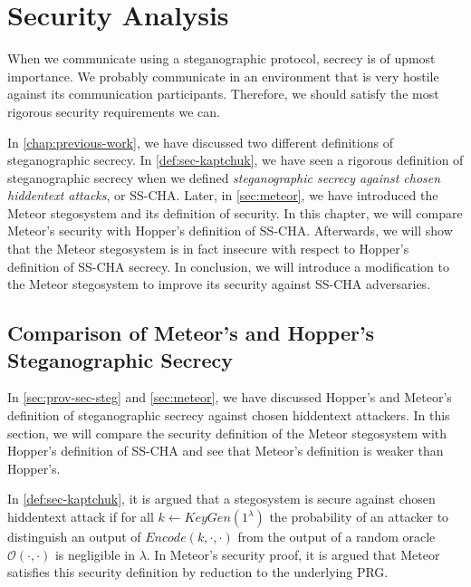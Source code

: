 \chapter{Security Analysis}
\label{chap:security}

When we communicate using a steganographic protocol, secrecy is of upmost importance.
We probably communicate in an environment that is very hostile against its communication participants.
Therefore, we should satisfy the most rigorous security requirements we can.

In \autoref{chap:previous-work}, we have discussed two different definitions of steganographic secrecy.
In \autoref{def:sec-kaptchuk}, we have seen a rigorous definition of steganographic secrecy when we defined \emph{steganographic secrecy against chosen hiddentext attacks}, or SS-CHA.
Later, in \autoref{sec:meteor}, we have introduced the Meteor stegosystem and its definition of security.
In this chapter, we will compare Meteor's security with Hopper's definition of SS-CHA.
Afterwards, we will show that the Meteor stegosystem is in fact insecure with respect to Hopper's definition of SS-CHA secrecy.
In conclusion, we will introduce a modification to the Meteor stegosystem to improve its security against SS-CHA adversaries.

\section{Comparison of Meteor's and Hopper's Steganographic Secrecy}

In \autoref{sec:prov-sec-steg} and \autoref{sec:meteor}, we have discussed Hopper's and Meteor's definition of steganographic secrecy against chosen hiddentext attackers. 
In this section, we will compare the security definition of the Meteor stegosystem with Hopper's definition of SS-CHA and see that Meteor's definition is weaker than Hopper's.

In \autoref{def:sec-kaptchuk}, it is argued that a stegosystem is secure against chosen hiddentext attack if for all $k \leftarrow KeyGen(1^\lambda)$ the probability of an attacker to distinguish an output of $Encode(k, \cdot, \cdot)$ from the output of a random oracle $\mathcal{O}(\cdot, \cdot)$ is negligible in $\lambda$. In Meteor's security proof, it is argued that Meteor satisfies this security definition by reduction to the underlying PRG.

